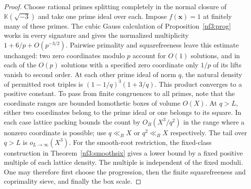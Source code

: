 \documentclass[11pt,letterpaper]{article}
\theoremstyle{definition}
\numberwithin{equation}{section}
\begin{document}
\begin{proof}
Choose rational primes splitting completely in the normal closure
of $\mathbb K(\sqrt{-3})$ and take one prime ideal over each.
Impose $f(\mathbf x)=1$ at finitely many of these primes.
The cubic Gauss calculation of Proposition~\ref{nf3:prog} works
in every signature and gives the normalized multiplicity
$1+6/p+O(p^{-3/2})$. Pairwise primality and squarefreeness leave
this estimate unchanged: two zero coordinates modulo $p$ account
for $O(1)$ solutions, and in each of the $O(p)$ solutions with a
specified zero coordinate only $1/p$ of its lifts vanish to
second order. At each other prime ideal of norm $q$, the natural
density of permitted root triples is
$(1-1/q)^3(1+3/q)$. This product converges to a positive constant.
To pass from finite congruences to all primes, note that the
coordinate ranges are bounded homothetic boxes of volume $O(X)$.
At $q>L$, either two coordinates belong to the prime ideal or one
belongs to its square. In each case lattice packing bounds the
count by $O_B(X^3/q^2)$ in the range where a nonzero coordinate
is possible; use $q\ll_B X$ or $q^2\ll_B X$ respectively.
The tail over $q>L$ is $o_{L\to\infty}(X^3)$.
For the smooth-root restriction, the fixed-class construction in
Theorem~\ref{nf3:smoothsix} gives a lower bound by a fixed positive
multiple of each lattice density. The multiple is independent of
the fixed moduli. One may therefore first choose the progression,
then the finite squarefreeness and coprimality sieve, and finally
the box scale.


\end{proof}
\end{document}
